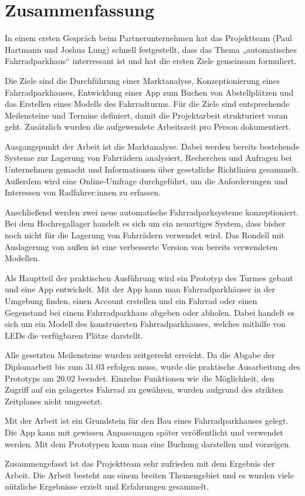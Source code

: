\section{Zusammenfassung}

In einem ersten Gespräch beim Partnerunternehmen hat das Projektteam (Paul Hartmann und Joshua Lung) schnell festgestellt, dass das Thema „automatisches Fahrradparkhaus“ interressant ist und hat die ersten Ziele gemeinsam formuliert.

\noindent Die Ziele sind die Durchführung einer Marktanalyse, Konzeptionierung eines Fahrradparkhauses, Entwicklung einer App zum Buchen von Abstellplätzen und das Erstellen eines Modells des Fahrradturms. Für die Ziele sind entsprechende Meilensteine und Termine definiert, damit die Projektarbeit strukturiert voran geht. Zusätzlich wurden die aufgewendete Arbeitszeit pro Person dokumentiert.

\bigskip


\noindent Ausgangspunkt der Arbeit ist die Marktanalyse. Dabei werden bereits bestehende Systeme zur Lagerung von Fahrrädern analysiert, Recherchen und Anfragen bei Unternehmen gemacht und Informationen über gesetzliche Richtlinien gesammelt. Außerdem wird eine Online-Umfrage durchgeführt, um die Anforderungen und Interessen von Radfahrer:innen zu erfassen.

\smallskip \noindent Anschließend werden zwei neue automatische Fahrradparksysteme konzeptioniert. Bei dem Hochregallager handelt es sich um ein neuartiges System, dass bisher noch nicht für die Lagerung von Fahrrädern verwendet wird. Das Rondell mit Auslagerung von außen ist eine verbesserte Version von bereits verwendeten Modellen.

\smallskip \noindent Als Hauptteil der praktischen Ausführung wird ein Prototyp des Turmes gebaut und eine App entwickelt. Mit der App kann man Fahrradparkhäuser in der Umgebung finden, einen Account erstellen und ein Fahrrad oder einen Gegenstand bei einem Fahrradparkhaus abgeben oder abholen. Dabei handelt es sich um ein Modell des konstruierten Fahrradparkhauses, welches mithilfe von LEDs die verfügbaren Plätze darstellt.

\smallskip \noindent Alle gesetzten Meilensteine wurden zeitgerecht erreicht. Da die Abgabe der Diplomarbeit bis zum 31.03 erfolgen muss, wurde die praktische Ausarbeitung des Prototyps am 20.02 beendet. Einzelne Funktionen wie die Möglichkeit, den Zugriff auf ein gelagertes Fahrrad zu gewähren, wurden aufgrund des strikten Zeitplanes nicht umgesetzt.

\bigskip


\noindent Mit der Arbeit ist ein Grundstein für den Bau eines Fahrradparkhauses gelegt. Die App kann mit gewissen Anpassungen später veröffentlicht und verwendet werden. Mit dem Prototypen kann man eine Buchung darstellen und vorzeigen.

\noindent Zusammengefasst ist das Projektteam sehr zufrieden mit dem Ergebnis der Arbeit. Die Arbeit besteht aus einem breiten Themengebiet und es wurden viele nützliche Ergebnisse erzielt und Erfahrungen gesammelt.
